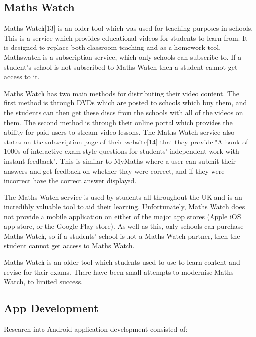 \documentclass{article}
\begin{document}
\subsection{Maths Watch}

Maths Watch[13] is an older tool which was used for teaching purposes in schools. This is a service which provides educational videos for students to learn from. It is designed to replace both classroom teaching and as a homework tool. Mathswatch is a subscription service, which only schools can subscribe to. If a student's school is not subscribed to Maths Watch then a student cannot get access to it. \par

Maths Watch has two main methods for distributing their video content. The first method is through DVDs which are posted to schools which buy them, and the students can then get these discs from the schools with all of the videos on them. The second method is through their online portal which provides the ability for paid users to stream video lessons. The Maths Watch service also states on the subscription page of their website[14] that they provide "A bank of 1000s of interactive exam-style questions for students' independent work with instant feedback". This is similar to MyMaths where a user can submit their answers and get feedback on whether they were correct, and if they were incorrect have the correct answer displayed. \par

The Maths Watch service is used by students all throughout the UK and is an incredibly valuable tool to aid their learning. Unfortunately, Maths Watch does not provide a mobile application on either of the major app stores (Apple iOS app store, or the Google Play store). As well as this, only schools can purchase Maths Watch, so if a students' school is not a Maths Watch partner, then the student cannot get access to Maths Watch. \par

Maths Watch is an older tool which students used to use to learn content and revise for their exams. There have been small attempts to modernise Maths Watch, to limited success. \par

\subsection{App Development}

Research into Android application development consisted of: 
\end{document}
